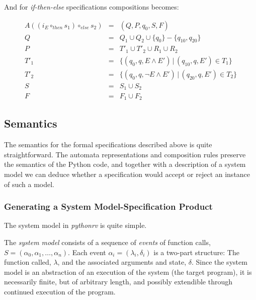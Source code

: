 And for \textit{if-then-else} specifications compositions becomes:

\medskip
\[
  \begin{array}{rcl}
  A((i_E \circ_{then} s_1) \circ_{else} s_2) & = & (Q, P, q_0, S, F) \\
                                           Q & = & Q_1 \cup Q_2 \cup \{q_0\} - \{q_{10}, q_{20}\} \\
                                           P & = & T'_1 \cup T'_2 \cup R_1 \cup R_2 \\
                                        T'_1 & = & \{(q_0, q, E       \wedge E') \, | \, (q_{10}, q, E') \in T_1\} \\
                                        T'_2 & = & \{(q_0, q, \neg E \wedge E') \, | \, (q_{20}, q, E') \in T_2\} \\
                                           S & = & S_1 \cup S_2 \\
                                           F & = & F_1 \cup F_2
  \end{array}
\]
\medskip





\subsection{Semantics} \label{section-approach-formal-foundation-semantics}

The semantics for the formal specifications described above is quite
straightforward. The automata representations and composition rules preserve
the semantics of the Python code, and together with a description of a system
model we can deduce whether a specification would accept or reject an instance
of such a model.

\subsubsection{Generating a System Model-Specification Product}

The system model in \textit{pythonrv} is quite simple.

\begin{mydef}\label{def-system-model}
The \textit{system model} consists of a sequence of \textit{events} of function
calls, $S = (\alpha_0, \alpha_1, \dots, \alpha_n)$. Each event $\alpha_i =
(\lambda_i, \delta_i)$ is a two-part structure: The function called, $\lambda$,
and the associated arguments and state, $\delta$. Since the system model is an
abstraction of an execution of the system (the target program), it is
necessarily finite, but of arbitrary length, and possibly extendible through
continued execution of the program.
\end{mydef}

